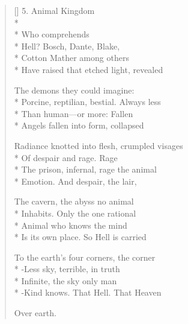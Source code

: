 \begin{verse}[\versewidth]
5. Animal Kingdom\\*
~\\*
\hspace{3\vgap} Who comprehends\\*
Hell? Bosch, Dante, Blake,\\*
Cotton Mather among others\\*
Have raised that etched light, revealed

The demons they could imagine:\\*
Porcine, reptilian, bestial. Always less\\*
Than human---or more: Fallen\\*
Angels fallen into form, collapsed

Radiance knotted into flesh, crumpled visages\\*
Of despair and rage. Rage\\*
The prison, infernal, rage the animal\\*
Emotion.  And despair, the lair,

The cavern, the abyss no animal\\*
Inhabits. Only the one rational \\*
Animal who knows the mind\\*
Is its own place.   So Hell is carried

To the earth's four corners, the corner\\*
-Less sky, terrible, in truth\\*
Infinite, the sky only man\\*
-Kind knows. That Hell. That Heaven

Over earth.
\end{verse}
